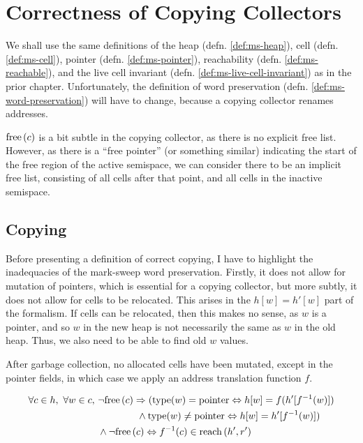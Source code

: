 \chapter{Correctness of Copying Collectors}
\label{sec:copying}

We shall use the same definitions of the \gls{heap}
(defn. \ref{def:ms-heap}), \gls{cell} (defn. \ref{def:ms-cell}),
\gls{pointer} (defn. \ref{def:ms-pointer}), reachability
(defn. \ref{def:ms-reachable}), and the live cell invariant
(defn. \ref{def:ms-live-cell-invariant}) as in the prior
chapter. Unfortunately, the definition of word preservation
(defn. \ref{def:ms-word-preservation}) will have to change, because a
\gls{copying} \gls{collector} renames addresses.

$\mathrm{free}\left(c\right)$ is a bit subtle in the copying collector, as there is no
explicit free list. However, as there is a ``free pointer'' (or
something similar) indicating the start of the free region of the
active semispace, we can consider there to be an implicit free list,
consisting of all cells after that point, and all cells in the
inactive semispace.

\section{Copying}
\label{sec:copying-copying}

Before presenting a definition of correct copying, I have to highlight
the inadequacies of the \gls{mark-sweep} word preservation. Firstly,
it does not allow for mutation of \glspl{pointer}, which is essential
for a \gls{copying} \gls{collector}, but more subtly, it does not
allow for \glspl{cell} to be relocated. This arises in the $h[w] =
h'[w]$ part of the formalism. If \glspl{cell} can be relocated, then
this makes no sense, as $w$ is a \gls{pointer}, and so $w$ in the new
\gls{heap} is not necessarily the same as $w$ in the old
\gls{heap}. Thus, we also need to be able to find old $w$ values.

\begin{definition}
  \label{def:c-correct-copying}
  After garbage collection, no allocated cells have been mutated,
  except in the pointer fields, in which case we apply an address
  translation function $f$.

  \begin{align*}
    \forall c \in h,\ \forall w \in c,\ &\lnot\mathrm{free}\left(c\right) \Rightarrow
    (\mathrm{type}(w) = \mathrm{pointer} \Leftrightarrow h[w] = f(h'[f^{-1}(w)])\\
    &\quad\quad\quad\quad \land \mathrm{type}(w) \neq \mathrm{pointer}
    \Leftrightarrow h[w] = h'[f^{-1}(w)])\\
    &\land \lnot\mathrm{free}\left(c\right) \Leftrightarrow f^{-1}(c) \in \mathrm{reach}\left(h', r'\right)
  \end{align*}
\end{definition}

